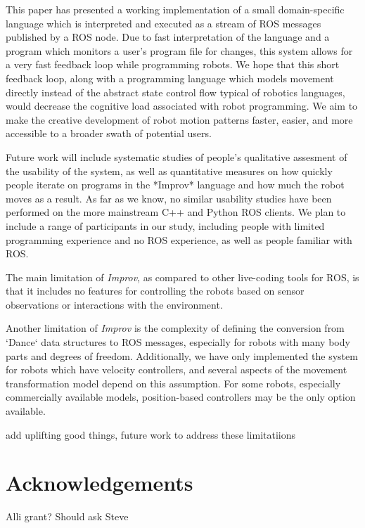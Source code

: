 \documentclass[sigconf]{acmart}
\begin{document}
This paper has presented a working implementation of a small domain-specific
language which is interpreted and executed as a stream of ROS messages published
by a ROS node. Due to fast interpretation of the language and a program which
monitors a user's program file for changes, this system allows for a very fast
feedback loop while programming robots. We hope that this short feedback loop,
along with a programming language which models movement directly instead of the
abstract state control flow typical of robotics languages, would decrease the
cognitive load associated with robot programming. We aim to make the creative
development of robot motion patterns faster, easier, and more accessible to a
broader swath of potential users.

Future work will include systematic studies of people's qualitative assesment of
the usability of the system, as well as quantitative measures on how quickly
people iterate on programs in the *Improv* language and how much the robot moves
as a result. As far as we know, no similar usability studies have been performed
on the more mainstream C++ and Python ROS clients. We plan to include a range of
participants in our study, including people with limited programming experience
and no ROS experience, as well as people familiar with ROS.

The main limitation of \emph{Improv}, as compared to other live-coding tools for
ROS, is that it includes no features for controlling the robots based on sensor
observations or interactions with the environment.

Another limitation of \emph{Improv} is the complexity of defining the conversion
from `Dance` data structures to ROS messages, especially for robots with many
body parts and degrees of freedom. Additionally, we have only implemented the
system for robots which have velocity controllers, and several aspects of the
movement transformation model depend on this assumption. For some robots,
especially commercially available models, position-based controllers may be the
only option available.

{\color{red}add uplifting good things, future work to address these limitatiions}

\section{Acknowledgements}

{\color{red} Alli grant? Should ask Steve}



\end{document}
